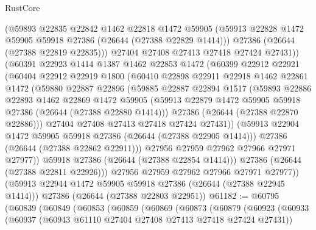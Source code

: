 \begin{lexlean}{RustCore}
\begin{coremodule}
              (@59893
                @22835
                @22842
                @1462
                @22818
                @1472
                @59905
                (@59913 @22828 @1472 @59905 @59918 @27386 (@26644 (@27388 @22829 @1414)))
                @27386
                (@26644 (@27388 @22819 @22835)))
              @27404
              @27408
              @27413
              @27418
              @27424
              @27431))
          (@60391
            @22923
            @1414
            @1387
            @1462
            @22853
            @1472
            (@60399
              @22912
              @22921
              (@60404
                @22912
                @22919
                @1800
                (@60410
                  @22898
                  @22911
                  @22918
                  @1462
                  @22861
                  @1472
                  (@59880
                    @22887
                    @22896
                    (@59885
                      @22887
                      @22894
                      @1517
                      (@59893
                        @22886
                        @22893
                        @1462
                        @22869
                        @1472
                        @59905
                        (@59913 @22879 @1472 @59905 @59918 @27386 (@26644 (@27388 @22880 @1414)))
                        @27386
                        (@26644 (@27388 @22870 @22886)))
                      @27404
                      @27408
                      @27413
                      @27418
                      @27424
                      @27431))
                  (@59913 @22904 @1472 @59905 @59918 @27386 (@26644 (@27388 @22905 @1414)))
                  @27386
                  (@26644 (@27388 @22862 @22911)))
                @27956
                @27959
                @27962
                @27966
                @27971
                @27977))
            @59918
            @27386
            (@26644 (@27388 @22854 @1414)))
          @27386
          (@26644 (@27388 @22811 @22926)))
        @27956
        @27959
        @27962
        @27966
        @27971
        @27977))
    (@59913 @22944 @1472 @59905 @59918 @27386 (@26644 (@27388 @22945 @1414)))
    @27386
    (@26644 (@27388 @22803 @22951))
@61182 := @60795
    (@60839
      (@60849
        (@60853
          (@60859
            (@60869
              (@60873
                (@60879
                  (@60923
                    (@60933
                      (@60937 (@60943 @61110 @27404 @27408 @27413 @27418 @27424 @27431))

\end{coremodule}
\end{lexlean}
